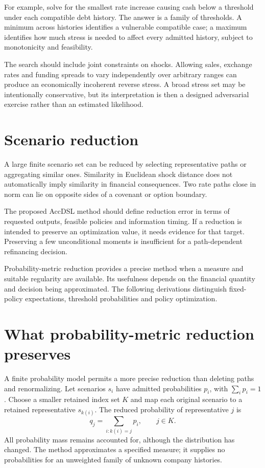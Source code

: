 For example, solve for the smallest rate increase causing cash below a threshold under each compatible debt history. The answer is a family of thresholds. A minimum across histories identifies a vulnerable compatible case; a maximum identifies how much stress is needed to affect every admitted history, subject to monotonicity and feasibility.

The search should include joint constraints on shocks. Allowing sales, exchange rates and funding spreads to vary independently over arbitrary ranges can produce an economically incoherent reverse stress. A broad stress set may be intentionally conservative, but its interpretation is then a designed adversarial exercise rather than an estimated likelihood.

\section{Scenario reduction}
A large finite scenario set can be reduced by selecting representative paths or aggregating similar ones. Similarity in Euclidean shock distance does not automatically imply similarity in financial consequences. Two rate paths close in norm can lie on opposite sides of a covenant or option boundary.

The proposed AccDSL method should define reduction error in terms of requested outputs, feasible policies and information timing. If a reduction is intended to preserve an optimization value, it needs evidence for that target. Preserving a few unconditional moments is insufficient for a path-dependent refinancing decision.

Probability-metric reduction provides a precise method when a measure and suitable regularity are available. Its usefulness depends on the financial quantity and decision being approximated. The following derivations distinguish fixed-policy expectations, threshold probabilities and policy optimization.

\section{What probability-metric reduction preserves}
A finite probability model permits a more precise reduction than deleting paths and renormalizing. Let scenarios $s_i$ have admitted probabilities $p_i$, with $\sum_i p_i=1$. Choose a smaller retained index set $K$ and map each original scenario to a retained representative $s_{k(i)}$. The reduced probability of representative $j$ is
\begin{equation}
 q_j=\sum_{i:k(i)=j}p_i,\qquad j\in K.
\end{equation}
All probability mass remains accounted for, although the distribution has changed. The method approximates a specified measure; it supplies no probabilities for an unweighted family of unknown company histories.

